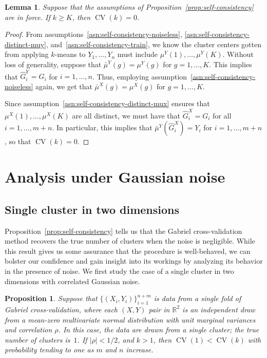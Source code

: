\documentclass[12pt]{article}
\newtheorem{lemma}{Lemma}
\newtheorem{proposition}{Proposition}
\newcommand{\CV}{\operatorname{CV}}
\newcommand{\R}{\mathbb{R}}
\newcommand{\muX}{\mu^{X}}
\newcommand{\muY}{\mu^{Y}}
\newcommand{\bmuX}{\bar \mu^{X}}
\newcommand{\bmuY}{\bar \mu^{Y}}
\newcommand{\hGX}{\hat G^{X}}
\newcommand{\hGY}{\hat G^{Y}}
\begin{document}
\begin{lemma}\label{lem:self-consistency2}
Suppose that the assumptions of Proposition~\ref{prop:self-consistency} are in
force.  If $k \geq K$, then $\CV(k) = 0$.
\end{lemma}
\begin{proof}
From assumptions~\ref{asn:self-consistency-noiseless},
\ref{asn:self-consistency-distinct-muy},
and~\ref{asn:self-consistency-train}, we know the cluster centers
gotten from applying $k$-means to $Y_1, \dotsc, Y_n$ must include
$\muY(1), \dotsc, \muY(K)$.  Without loss of generality, suppose that
$\bmuY(g) = \muY(g)$ for $g = 1, \dotsc, K$.  This implies that
$\hGY_i = G_i$ for $i = 1, \dotsc, n$.  Thus, employing
assumption~\ref{asn:self-consistency-noiseless} again, we get that
$\bmuX(g) = \muX(g)$ for $g = 1, \dotsc, K$.


Since assumption~\ref{asn:self-consistency-distinct-mux} ensures that
$\muX(1), \dotsc, \muX(K)$ are all distinct, we must have that $\hGX_i = G_i$
for all $i = 1, \dotsc, m+n$.  In particular, this implies that $\bmuY(\hGX_i)
= Y_i$ for $i = 1, \dotsc, m+n$, so that $\CV(k) = 0$.
\end{proof}



\section{Analysis under Gaussian noise}
\label{sec:theory-gaussian}

\subsection{Single cluster in two dimensions}

Proposition~\ref{prop:self-consistency} tells us that the Gabriel cross-validation
method recovers the true number of clusters when the noise is negligible.
While this result gives us some assurance that the procedure is well-behaved,
we can bolster our confidence and gain insight into its workings by analyzing
its behavior in the presence of noise.  We first study the case of a single
cluster in two dimensions with correlated Gaussian noise.

\begin{proposition}\label{prop:single-2d}
Suppose that $\{ (X_i, Y_i) \}_{i=1}^{n + m}$ is data from a single fold
of Gabriel cross-validation, where each $(X,Y)$ pair in $\R^2$ is an
independent draw from a mean-zero multivariate normal distribution with unit
marginal variances and correlation $\rho$.  In this case, the data are drawn
from a single cluster; the true number of clusters is~$1$.  If $|\rho| < 1/2$,
and $k > 1$, then $\CV(1) < \CV(k)$ with probability tending to one as $m$
and $n$ increase.
\end{proposition}
\end{document}
